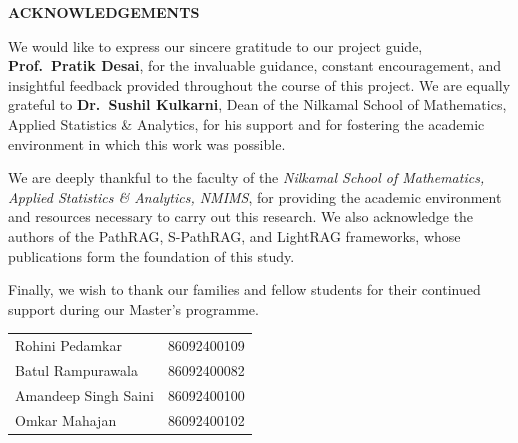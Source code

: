 \documentclass[12pt,a4paper,oneside]{report}
\begin{document}
\begin{titlepage}
    \thispagestyle{empty}
    \vspace*{1cm}
    \begin{center}
        {\LARGE\bfseries ACKNOWLEDGEMENTS}
    \end{center}
    \vspace{1cm}

    \noindent We would like to express our sincere gratitude to our project
    guide, \textbf{Prof.\ Pratik Desai}, for the invaluable guidance,
    constant encouragement, and insightful feedback provided throughout the
    course of this project. We are equally grateful to
    \textbf{Dr.\ Sushil Kulkarni}, Dean of the Nilkamal School of
    Mathematics, Applied Statistics \& Analytics, for his support and for
    fostering the academic environment in which this work was possible.

    We are deeply thankful to the faculty of the \textit{Nilkamal School of
    Mathematics, Applied Statistics \& Analytics, NMIMS}, for providing the
    academic environment and resources necessary to carry out this research.
    We also acknowledge the authors of the PathRAG, S-PathRAG, and LightRAG
    frameworks, whose publications form the foundation of this study.

    Finally, we wish to thank our families and fellow students for their
    continued support during our Master's programme.

    \vfill

    \begin{flushright}
        \begin{tabular}{@{}l l@{}}
            Rohini Pedamkar        & 86092400109 \\
            Batul Rampurawala      & 86092400082 \\
            Amandeep Singh Saini   & 86092400100 \\
            Omkar Mahajan          & 86092400102 \\
        \end{tabular}
    \end{flushright}
\end{titlepage}

\pagestyle{frontmatter}
\end{document}
